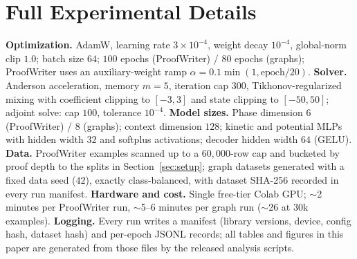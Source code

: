 \documentclass[11pt]{article}
\begin{document}
\section{Full Experimental Details}\label{app:details}
\textbf{Optimization.} AdamW, learning rate $3\times10^{-4}$, weight
decay $10^{-4}$, global-norm clip $1.0$; batch size $64$;
$100$ epochs (ProofWriter) / $80$ epochs (graphs); ProofWriter uses an
auxiliary-weight ramp $\alpha = 0.1\min(1,\text{epoch}/20)$.
\textbf{Solver.} Anderson acceleration, memory $m{=}5$, iteration cap
$300$, Tikhonov-regularized mixing with coefficient clipping to
$[-3,3]$ and state clipping to $[-50,50]$; adjoint solve: cap $100$,
tolerance $10^{-4}$. \textbf{Model sizes.} Phase dimension $6$
(ProofWriter) / $8$ (graphs); context dimension $128$; kinetic and
potential MLPs with hidden width $32$ and softplus activations;
decoder hidden width $64$ (GELU). \textbf{Data.} ProofWriter examples
scanned up to a $60{,}000$-row cap and bucketed by proof depth to the
splits in Section~\ref{sec:setup}; graph datasets generated with a
fixed data seed ($42$), exactly class-balanced, with dataset SHA-256
recorded in every run manifest. \textbf{Hardware and cost.} Single
free-tier Colab GPU; $\sim$2 minutes per ProofWriter run,
$\sim$5--6 minutes per graph run ($\sim$26 at $30$k examples).
\textbf{Logging.} Every run writes a manifest (library versions,
device, config hash, dataset hash) and per-epoch JSONL records; all
tables and figures in this paper are generated from those files by the
released analysis scripts.
\end{document}
